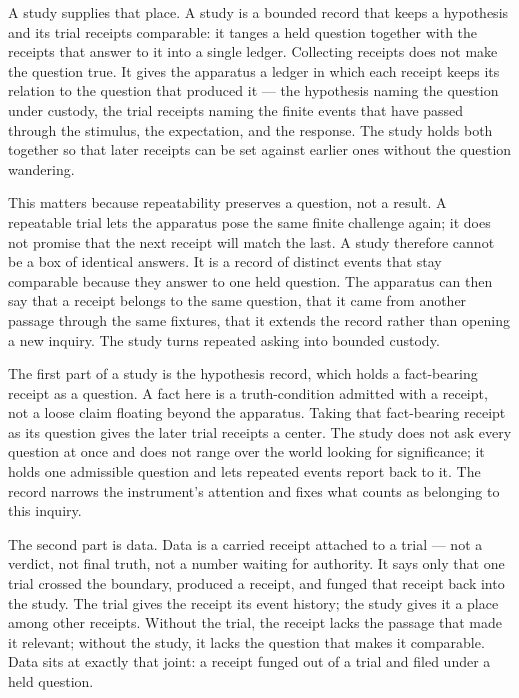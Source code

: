 A study supplies that place. A study is a bounded record that keeps a hypothesis and its trial receipts comparable: it tanges a held question together with the receipts that answer to it into a single ledger. Collecting receipts does not make the question true. It gives the apparatus a ledger in which each receipt keeps its relation to the question that produced it --- the hypothesis naming the question under custody, the trial receipts naming the finite events that have passed through the stimulus, the expectation, and the response. The study holds both together so that later receipts can be set against earlier ones without the question wandering.

This matters because repeatability preserves a question, not a result. A repeatable trial lets the apparatus pose the same finite challenge again; it does not promise that the next receipt will match the last. A study therefore cannot be a box of identical answers. It is a record of distinct events that stay comparable because they answer to one held question. The apparatus can then say that a receipt belongs to the same question, that it came from another passage through the same fixtures, that it extends the record rather than opening a new inquiry. The study turns repeated asking into bounded custody.

The first part of a study is the hypothesis record, which holds a fact-bearing receipt as a question. A fact here is a truth-condition admitted with a receipt, not a loose claim floating beyond the apparatus. Taking that fact-bearing receipt as its question gives the later trial receipts a center. The study does not ask every question at once and does not range over the world looking for significance; it holds one admissible question and lets repeated events report back to it. The record narrows the instrument's attention and fixes what counts as belonging to this inquiry.

The second part is data. Data is a carried receipt attached to a trial --- not a verdict, not final truth, not a number waiting for authority. It says only that one trial crossed the boundary, produced a receipt, and funged that receipt back into the study. The trial gives the receipt its event history; the study gives it a place among other receipts. Without the trial, the receipt lacks the passage that made it relevant; without the study, it lacks the question that makes it comparable. Data sits at exactly that joint: a receipt funged out of a trial and filed under a held question.

